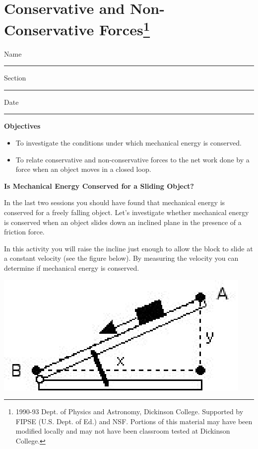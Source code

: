
\section{Conservative and Non-Conservative Forces\footnote{
1990-93 Dept. of Physics and Astronomy, Dickinson College. Supported by FIPSE
(U.S. Dept. of Ed.) and NSF. Portions of this material may have been modified
locally and may not have been classroom tested at Dickinson College.
}}

Name \rule{2.0in}{0.1pt}\hfill{}Section \rule{1.0in}{0.1pt}\hfill{}Date \rule{1.0in}{0.1pt}

\textbf{Objectives} 

\begin{itemize}
\item To investigate the conditions under which mechanical energy is conserved. 
\item To relate conservative and non-conservative forces to the net work done by a
force when an object moves in a closed loop.
\end{itemize}
\textbf{Is Mechanical Energy Conserved for a Sliding Object? }

In the last two sessions you should have found that mechanical energy is conserved
for a freely falling object. Let's investigate whether mechanical energy is
conserved when an object slides down an inclined plane in the presence of a
friction force.

In this activity you will raise the incline just enough to allow the block to
slide at a constant velocity (see the figure below). By measuring the velocity
you can determine if mechanical energy is conserved.

\vspace{0.3cm}
{\par\centering \includegraphics{conservative_fig1.eps} \par}
\vspace{0.3cm}

